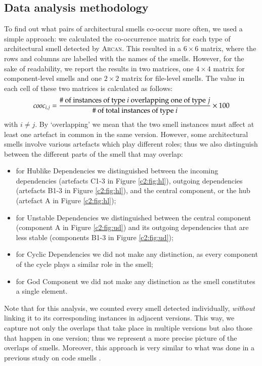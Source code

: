 \subsection{Data analysis methodology}\label{c4:sec:methodology-rq2}
To find out what pairs of architectural smells co-occur more often, we used a simple approach: we calculated the co-occurrence matrix for each type of architectural smell detected by \textsc{Arcan}. This resulted in a $6\times6$ matrix, where the rows and columns are labelled with the names of the smells. However, for the sake of readability, we report the results in two matrices, one $4\times4$ matrix for component-level smells and one $2\times2$ matrix for file-level smells. 
The value in each cell of these two matrices is calculated as follows: 
\begin{equation}
    cooc_{i,j} = \frac{\# \textnormal{ of instances of type } i \textnormal{ overlapping one of type } j}{\# \textnormal{ of total instances of type } i} \times 100
\end{equation}
with $i \neq j$.
By `overlapping' we mean that the two smell instances must affect at least one artefact in common in the same version.
However, some architectural smells involve various artefacts which play different roles; thus we also distinguish between the different parts of the smell that may overlap:
\begin{itemize}
    \item for Hublike Dependencies we distinguished between the incoming dependencies (artefacts C1-3 in Figure \ref{c2:fig:hl}), outgoing dependencies (artefacts B1-3 in Figure \ref{c2:fig:hl}), and the central component, or the hub (artefact A in Figure \ref{c2:fig:hl});
    \item for Unstable Dependencies we distinguished between the central component (component A in Figure \ref{c2:fig:ud}) and its outgoing dependencies that are less stable (components B1-3 in Figure \ref{c2:fig:ud});
    \item for Cyclic Dependencies we did not make any distinction, as every component of the cycle plays a similar role in the smell;
    \item for God Component we did not make any distinction as the smell constitutes a single element.
\end{itemize}

Note that for this analysis, we counted every smell detected individually, \emph{without} linking it to its corresponding instances in adjacent versions. This way, we capture not only the overlaps that take place in multiple versions but also those that happen in one version; thus we represent a more precise picture of the overlaps of smells. Moreover, this approach is very similar to what was done in a previous study on code smells \cite{Palomba2018}.

